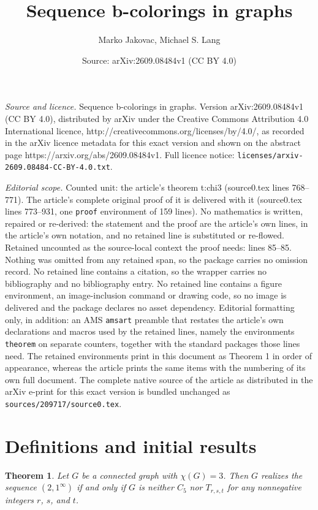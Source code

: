 \documentclass[10pt,a4paper]{amsart}
\title{Sequence b-colorings in graphs}
\author{Marko Jakovac, Michael S. Lang}
\date{Source: arXiv:2609.08484v1 (CC BY 4.0)}
\newtheorem{theorem}{Theorem}
\begin{document}
\maketitle

\noindent\emph{Source and licence.} Sequence b-colorings in graphs. Version arXiv:2609.08484v1 (CC BY 4.0), distributed by arXiv under the Creative Commons Attribution 4.0 International licence, http://creativecommons.org/licenses/by/4.0/, as recorded in the arXiv licence metadata for this exact version and shown on the abstract page https://arxiv.org/abs/2609.08484v1. Full licence notice: \texttt{licenses/arxiv-2609.08484-CC-BY-4.0.txt}.\par\smallskip

\noindent\textit{Editorial scope.} Counted unit: the article's theorem t:chi3 (source0.tex lines 768--771). The article's complete original proof of it is delivered with it (source0.tex lines 773--931, one \texttt{proof} environment of 159 lines). No mathematics is written, repaired or re-derived: the statement and the proof are the article's own lines, in the article's own notation, and no retained line is substituted or re-flowed.  Retained uncounted as the source-local context the proof needs: lines 85--85.  Nothing was omitted from any retained span, so the package carries no omission record.  No retained line contains a citation, so the wrapper carries no bibliography and no bibliography entry.  No retained line contains a figure environment, an image-inclusion command or drawing code, so no image is delivered and the package declares no asset dependency.  Editorial formatting only, in addition: an AMS \texttt{amsart} preamble that restates the article's own declarations and macros used by the retained lines, namely the environments \texttt{theorem} on separate counters, together with the standard packages those lines need.  The retained environments print in this document as Theorem 1 in order of appearance, whereas the article prints the same items with the numbering of its own full document.  The complete native source of the article as distributed in the arXiv e-print for this exact version is bundled unchanged as \texttt{sources/209717/source0.tex}.
\section{Definitions and initial results}\label{s:defs}

\begin{theorem}\label{t:chi3}
Let $G$ be a connected graph with $\chi(G)=3$. 
Then $G$ realizes the sequence $(2,1^\infty)$ if and only if $G$ is neither $C_5$ nor $T_{r,s,t}$ for any nonnegative integers $r$, $s$, and $t$. 
\end{theorem}
\end{document}
